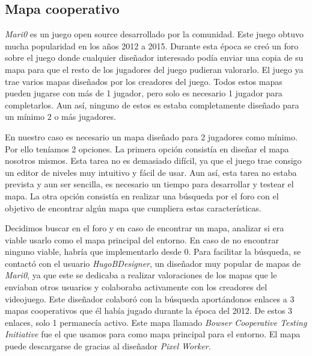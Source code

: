 \subsection{Mapa cooperativo}
\textit{Mari0} es un juego open source desarrollado por la comunidad. Este juego obtuvo mucha popularidad en los años 2012 a 2015. Durante esta época se creó un foro sobre el juego donde cualquier diseñador interesado podía enviar una copia de su mapa para que el resto de los jugadores del juego pudieran valorarlo. El juego ya trae varios mapas diseñados por los creadores del juego. Todos estos mapas pueden jugarse con más de 1 jugador, pero solo es necesario 1 jugador para completarlos. Aun así, ninguno de estos es estaba completamente diseñado para un mínimo 2 o más jugadores.

En nuestro caso es necesario un mapa diseñado para 2 jugadores como mínimo. Por ello teníamos 2 opciones. La primera opción consistía en diseñar el mapa nosotros mismos. Esta tarea no es demasiado difícil, ya que el juego trae consigo un editor de niveles muy intuitivo y fácil de usar. Aun así, esta tarea no estaba prevista y aun ser sencilla, es necesario un tiempo para desarrollar y testear el mapa. La otra opción consistía en realizar una búsqueda por el foro \cite{mari0-forum} con el objetivo de encontrar algún mapa que cumpliera estas características. 

Decidimos buscar en el foro y en caso de encontrar un mapa, analizar si era viable usarlo como el mapa principal del entorno. En caso de no encontrar ninguno viable, habría que implementarlo desde 0. Para facilitar la búsqueda, se contactó con el usuario \textit{HugoBDesigner}, un diseñador muy popular de mapas de \textit{Mari0}, ya que este se dedicaba a realizar valoraciones de los mapas que le enviaban otros usuarios y colaboraba activamente con los creadores del videojuego. Este diseñador colaboró con la búsqueda aportándonos enlaces a 3 mapas cooperativos que él había jugado durante la época del 2012. De estos 3 enlaces, solo 1 permanecía activo. Este mapa llamado \textit{Bowser Cooperative Testing Initiative} fue el que usamos para como mapa principal para el entorno. El mapa puede descargarse de \cite {mari0-mapa} gracias al diseñador \textit{Pixel Worker}. 

